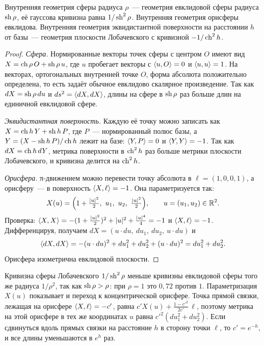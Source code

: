 \begin{theorem}\label{thm:krivizna}
Внутренняя геометрия сферы радиуса $\rho$~--- геометрия евклидовой сферы радиуса $\operatorname{sh}\rho$, её гауссова кривизна равна $1/\operatorname{sh}^2\rho$. Внутренняя геометрия орисферы евклидова. Внутренняя геометрия эквидистантной поверхности на расстоянии $h$ от базы~--- геометрия плоскости Лобачевского с кривизной $-1/\operatorname{ch}^2h$.
\end{theorem}
\begin{proof}
\emph{Сфера.} Нормированные векторы точек сферы с центром $O$ имеют вид $X=\operatorname{ch}\rho\,O+\operatorname{sh}\rho\,u$, где $u$ пробегает векторы с $\langle u,O\rangle=0$ и $\langle u,u\rangle=1$. На векторах, ортогональных внутренней точке $O$, форма абсолюта положительно определена, то есть задаёт обычное евклидово скалярное произведение. Так как $dX=\operatorname{sh}\rho\,du$ и $ds^2=\langle dX,dX\rangle$, длины на сфере в $\operatorname{sh}\rho$ раз больше длин на единичной евклидовой сфере.

\emph{Эквидистантная поверхность.} Каждую её точку можно записать как $X=\operatorname{ch} h\,Y+\operatorname{sh} h\,P$, где $P$~--- нормированный полюс базы, а $Y=(X-\operatorname{sh} h\,P)/\operatorname{ch} h$ лежит на базе: $\langle Y,P\rangle=0$ и $\langle Y,Y\rangle=-1$. Так как $dX=\operatorname{ch} h\,dY$, метрика поверхности в $\operatorname{ch}^2h$ раз больше метрики плоскости Лобачевского, и кривизна делится на $\operatorname{ch}^2h$.

\emph{Орисфера.} π-движением можно перевести точку абсолюта в $\ell=(1,0,0,1)$, а орисферу~--- в поверхность $\langle X,\ell\rangle=-1$. Она параметризуется так:
\[
X(u)=\Bigl(1+\tfrac{|u|^2}2,\ u_1,\ u_2,\ \tfrac{|u|^2}2\Bigr),\qquad u=(u_1,u_2)\in\R^2.
\]
Проверка: $\langle X,X\rangle=-(1+\tfrac{|u|^2}2)^2+|u|^2+\tfrac{|u|^4}4=-1$ и $\langle X,\ell\rangle=-1$. Дифференцируя, получаем $dX=(u\cdot du,\ du_1,\ du_2,\ u\cdot du)$ и
\[
\langle dX,dX\rangle=-(u\cdot du)^2+du_1^2+du_2^2+(u\cdot du)^2=du_1^2+du_2^2.
\]
Орисфера изометрична евклидовой плоскости.
\end{proof}

Кривизна сферы Лобачевского $1/\operatorname{sh}^2\rho$ меньше кривизны евклидовой сферы того же радиуса $1/\rho^2$, так как $\operatorname{sh}\rho>\rho$: при $\rho=1$ это $0{,}72$ против $1$. Параметризация $X(u)$ показывает и переход к концентрической орисфере. Точка прямой связки, лежащая на орисфере $\langle X,\ell\rangle=-c'$, равна $c'X(u)+\tfrac{1-c'^2}{2c'}\,\ell$, поэтому метрика на этой орисфере в тех же координатах $u$ равна $c'^2(du_1^2+du_2^2)$. Если сдвинуться вдоль прямых связки на расстояние $h$ в сторону точки $\ell$, то $c'=e^{-h}$, и все длины уменьшаются в $e^{h}$ раз.

